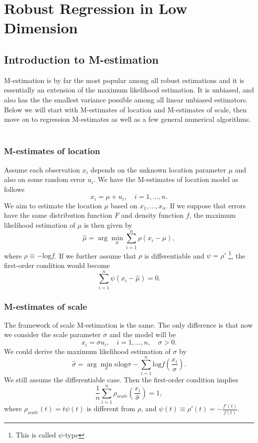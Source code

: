 \documentclass[conference]{IEEEtran}
\begin{document}
\section{Robust Regression in Low Dimension}
\subsection{Introduction to M-estimation}

M-estimation is by far the most popular among all robust estimations and it is essentially an extension of the maximum likelihood estimation. It is unbiased, and also has the the smallest variance possible among all linear unbiased estimators. Below we will start with M-estimates of location and M-estimates of scale, then move on to regression M-estimates as well as a few general numerical algorithms. \\~

\subsubsection{M-estimates of location}

Assume each observation $x_i$ depends on the unknown location parameter $\mu$ and also on some random error $u_i$. We have the M-estimates of location model as follows
$$x_i = \mu + u_i, \quad i = 1,...,n.$$
We aim to estimate the location $\mu$ based on $x_1, ..., x_n$. If we suppose that errors have the same distribution function $F$ and density function $f$, the maximum likelihood estimation of $\mu$ is then given by
$$\hat{\mu} = \arg \min_{\mu} \sum_{i=1}^{n}\rho(x_i - \mu),$$
\noindent where $\rho \equiv -\text{log}f$. If we further assume that $\rho$ is differentiable and $\psi = \rho'$ \footnote{This is called $\psi$-type}, the first-order condition would become
$$\sum_{i=1}^{n} \psi(x_i - \hat{\mu}) = 0.$$

\subsubsection{M-estimates of scale}

The framework of scale M-estimation is the same. The only difference is that now we consider the scale parameter $\sigma$ and the model will be
$$x_i = \sigma u_i, \quad i = 1,...,n, \quad \sigma > 0.$$
We could derive the maximum likelihood estimation of $\sigma$ by 
$$\hat{\sigma} = \arg \min_{\sigma} n \text{log} \sigma - \sum_{i=1}^{n} \text{log}f(\frac{x_i}{\sigma}).$$
We still assume the differentiable case. Then the first-order condition implies
$$\frac{1}{n} \sum_{i=1}^{n} \rho_{scale}(\frac{x_i}{\hat{\sigma}}) = 1,$$
\noindent where $\rho_{scale}(t) = t \psi(t)$ is different from $\rho$, and $\psi(t) \equiv \rho'(t) = -\frac{f'(t)}{f(t)}$.
\end{document}
